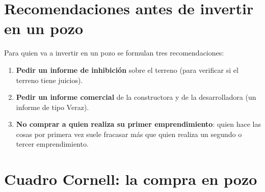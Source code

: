 \documentclass[12pt,oneside]{book}
\begin{document}
\section{Recomendaciones antes de invertir en un pozo}

Para quien va a invertir en un pozo se formulan tres recomendaciones:

\begin{enumerate}
    \item \textbf{Pedir un informe de inhibición} sobre el terreno (para verificar si el terreno tiene juicios).
    \item \textbf{Pedir un informe comercial} de la constructora y de la desarrolladora (un informe de tipo Veraz).
    \item \textbf{No comprar a quien realiza su primer emprendimiento}: quien hace las cosas por primera vez suele fracasar más que quien realiza un segundo o tercer emprendimiento.
\end{enumerate}

\section{Cuadro Cornell: la compra en pozo}
\end{document}
